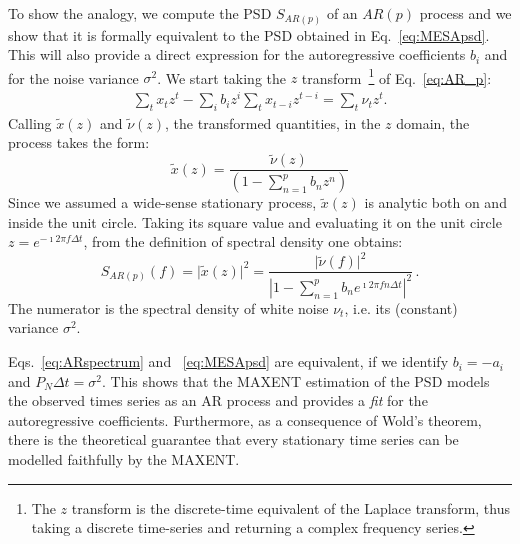 \documentclass{aa}
\begin{document}
To show the analogy, we compute the PSD $S_{AR(p)}$ of an $AR(p)$ process and we show that it is formally equivalent to the PSD obtained in Eq.~\eqref{eq:MESApsd}. This will also provide a direct expression for the autoregressive coefficients $b_i$ and for the noise variance $\sigma^2$.
We start taking the $z$ transform~\footnote{The $z$ transform is the discrete-time equivalent of the Laplace transform, thus taking a discrete time-series and returning a complex frequency series.} of Eq.~\eqref{eq:AR_p}: 
\begin{align}
    \sum_t x_t z^t - \sum_i b_i z^i\sum_t x_{t - i} z^{t - i} = \sum_t \nu_t z^t.
\end{align}
Calling $\tilde x(z)$ and $\tilde \nu (z)$, the transformed quantities, 
in the $z$ domain, the process takes the form:
\begin{equation}
    \tilde x(z) = \frac{\tilde\nu(z)}{\left(1 - \sum_{n = 1}^p b_n z^n \right)}
\end{equation}
Since we assumed a wide-sense stationary process, $\tilde{x}(z)$ is analytic both on and inside the unit circle. Taking its square value and evaluating it on the unit circle $z = e^{-\imath 2 \pi f \Delta t}$, from the definition of spectral density one obtains:
\begin{equation}\label{eq:ARspectrum}
    S_{AR(p)}(f) = \vert \tilde x(z)\vert ^ 2 = 
    \frac{\vert \tilde \nu(f) \vert ^ 2}{\left\vert 1 - \sum_{n = 1}^p b_n e^{\imath 2 \pi f n \Delta t} \right\vert ^ 2}\,.
\end{equation}
The numerator is the spectral density of white noise $\nu_t$, i.e. its (constant) variance $\sigma^2$.

Eqs.~\eqref{eq:ARspectrum} and ~\eqref{eq:MESApsd} are equivalent, if we identify $b_i = - a_i$ and $P_N \Delta t= \sigma ^ 2$.
This shows that the MAXENT estimation of the PSD models the observed times series as an AR process and provides a {\it fit} for the autoregressive coefficients.
Furthermore, as a consequence of Wold's theorem, there is the theoretical guarantee that every stationary time series can be modelled faithfully by the MAXENT.
\end{document}
